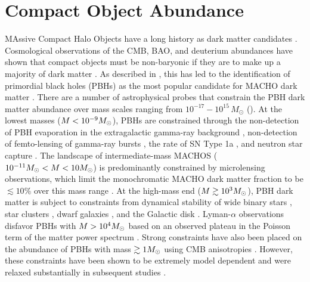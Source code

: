 \section{Compact Object Abundance }
\label{sec:compact_objects}

MAssive Compact Halo Objects \citep[MACHOs;][]{1991ApJ...366..412G} have a long history as dark matter candidates \citep{1974ApJ...193L...1O, 1980ApJS...44...73B, 1981ApJ...243..140G, 1986ApJ...304....1P, Bellido:1996, Clesse:2015, Bird:2016, Clesse:2016}. 
Cosmological observations of the CMB, BAO, and deuterium abundances have shown that compact objects must be non-baryonic if they are to make up a majority of dark matter \citep[\eg][]{Ade:2015xua}. 
As described in , this has led to the identification of primordial black holes (PBHs) as the most popular candidate for MACHO dark matter \citep{Bellido:1996}.
There are a number of astrophysical probes that constrain the PBH dark matter abundance over mass scales ranging from $10^{-17}-10^{15}\,M_\odot$ ().
At the lowest masses ($M < 10^{-9}M_\odot$), PBHs are constrained through the non-detection of PBH evaporation in the extragalactic gamma-ray background \citep[\eg,][]{0912.5297, 1604.05349}, non-detection of femto-lensing of gamma-ray bursts \citep[\eg,][]{1204.2056}, the rate of SN Type 1a \citep{1805.07381}, and neutron star capture \citep[\eg,][]{1301.4984}.
The landscape of intermediate-mass MACHOS ($10^{-11} M_\odot < M < 10 M_\odot$) is predominantly constrained by microlensing observations, which limit the monochromatic MACHO dark matter fraction to be $\lesssim 10\%$ over this mass range \citep[\eg][]{2001ApJ...550L.169A, 2007A&A...469..387T, 2009MNRAS.397.1228W, 1509.04899, 1701.02151, Calcino:2018}.
At the high-mass end ($M \gtrsim 10^3M_\odot$), PBH dark matter is subject to constraints from dynamical stability of wide binary stars \citep[\eg][]{2009MNRAS.396L..11Q, 2004ApJ...601..311Y}, star clusters \citep[\eg][]{2016ApJ...824L..31B, 1611.05052}, dwarf galaxies \citep{1704.01668}, and the Galactic disk \citep[\eg][]{1985ApJ...299..633L, 1994ApJ...437..184X}.
Lyman-$\alpha$ observations disfavor PBHs with $M > 10^4M_\odot$ based on an observed plateau in the Poisson term of the matter power spectrum \citep{astro-ph/0302035}.
Strong constraints have also been placed on the abundance of PBHs with mass $\gtrsim 1 M_\odot$ using CMB anisotropies \citep{2008ApJ...680..829R}.
However, these constraints have been shown to be extremely model dependent and were relaxed substantially in subsequent studies \citep{2017PhRvD..95d3534A, Clesse:2017}.
